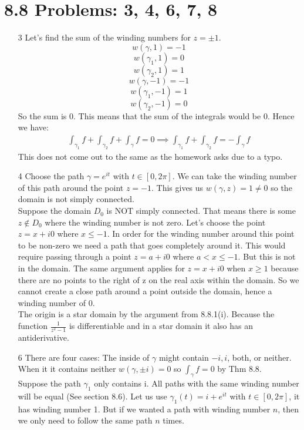\documentclass{article}
\begin{document}
  \section{8.8 Problems: 3, 4, 6, 7, 8}
  \begin{enumerate}
    \item[3]
      Let's find the sum of the winding numbers for $z=\pm1$.
      \[w(\gamma,1)=-1\]
      \[w(\gamma_1,1)=0\]
      \[w(\gamma_2,1)=1\]
      \[w(\gamma,-1)=-1\]
      \[w(\gamma_1,-1)=1\]
      \[w(\gamma_2,-1)=0\]
      So the sum is 0. This means that the sum of the integrals would be 0. Hence we have:
      \begin{align*}
        \int_{\gamma_1}f+\int_{\gamma_2}f+\int_{\gamma}f=0
        \implies\int_{\gamma_1}f+\int_{\gamma_2}f=-\int_{\gamma}f
      \end{align*}
      This does not come out to the same as the homework asks due to a typo.
    \item[4]
      Choose the path $\gamma=e^{it}$ with $t\in[0,2\pi]$. We can take the winding number of this path around the point $z=-1$. This gives us $w(\gamma,z)=1\neq0$ so the domain is not simply connected.\\
      Suppose the domain $D_0$ is NOT simply connected. That means there is some $z\notin D_0$ where the winding number is not zero. Let's choose the point $z=x+i0$ where $x\leq-1$. In order for the winding number around this point to be non-zero we need a path that goes completely around it. This would require passing through a point $z=a+i0$ where $a<x\leq-1$. But this is not in the domain. The same argument applies for $z=x+i0$ when $x\geq1$ because there are no points to the right of z on the real axis within the domain. So we cannot create a close path around a point outside the domain, hence a winding number of 0.\\
      The origin is a star domain by the argument from 8.8.1(i). Because the function $\frac{1}{z^2-1}$ is differentiable and in a star domain it also has an antiderivative.
    \item[6]
      There are four cases: The inside of $\gamma$ might contain $-i,i$, both, or neither. When it it contains neither $w(\gamma,\pm i)=0$ so $\int_\gamma f=0$ by Thm 8.8.\\
      Suppose the path $\gamma_1$ only contains i. All paths with the same winding number will be equal (See section 8.6). Let us use $\gamma_1(t)=i+e^{it}$ with $t\in[0,2\pi]$, it has winding number 1. But if we wanted a path with winding number $n$, then we only need to follow the same path $n$ times.

\end{enumerate}
\end{document}
